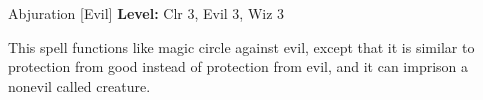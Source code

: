 {Abjuration [Evil]}
{
	\textbf{Level:}
	Clr 3, Evil 3, Wiz 3\\
}
{
	This spell functions like magic circle against evil, except that it is similar to protection from good instead of protection from evil, and it can imprison a nonevil called creature.

}
